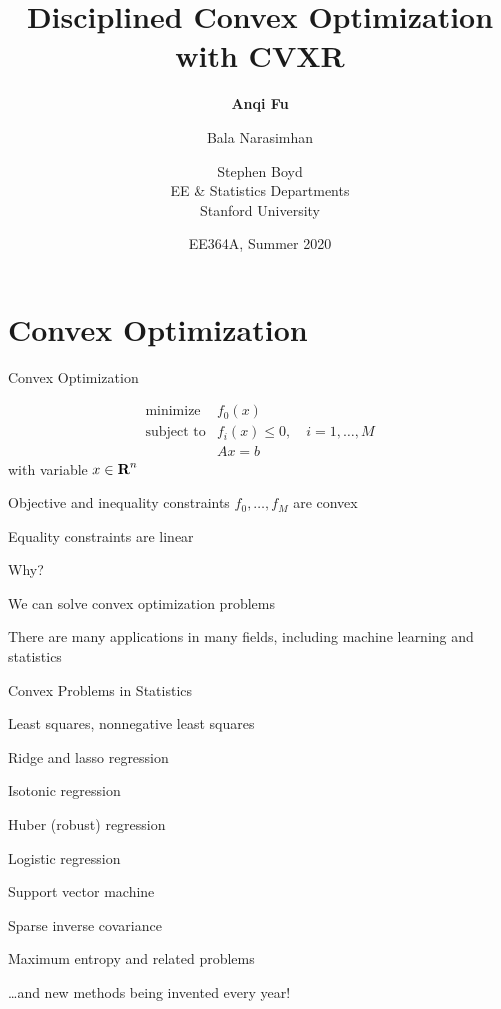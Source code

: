 \documentclass{beamer}
\title{Disciplined Convex Optimization with CVXR}
\author{\textbf{Anqi Fu} \and Bala Narasimhan \and Stephen Boyd \\[2ex]
	EE \& Statistics Departments\\[1ex]
	Stanford University}
\date{EE364A, Summer 2020}
\begin{document}
	
\begin{frame}
	\titlepage
\end{frame}

\begin{frame}
	\tableofcontents
\end{frame}

\section{Convex Optimization}

\begin{frame}{Convex Optimization} %
	
	\[
	\begin{array}{ll} \mbox{minimize} & f_0(x)\\
	\mbox{subject to} & f_i(x) \leq 0, \quad i=1, \ldots, M\\
	& Ax=b
	\end{array}
	\]
	with variable $x \in {\mbox{\bf R}}^n$
	
	\BIT
		\item Objective and inequality constraints $f_0, \ldots, f_M$ are convex %
		\item Equality constraints are linear
	\EIT
	\pause
	
	\vfill
	Why?
	\BIT
		\item We can solve convex optimization problems
		\item There are many applications in many fields, including machine learning and statistics
	\EIT
	
\end{frame}

\begin{frame}{Convex Problems in Statistics}
	\BIT
		\item Least squares, nonnegative least squares
		\item Ridge and lasso regression
		\item Isotonic regression
		\item Huber (robust) regression
		\item Logistic regression
		\item Support vector machine
		\item Sparse inverse covariance
		\item Maximum entropy and related problems
		\item \ldots and new methods being invented every year!
	\EIT
\end{frame}
\end{document}
